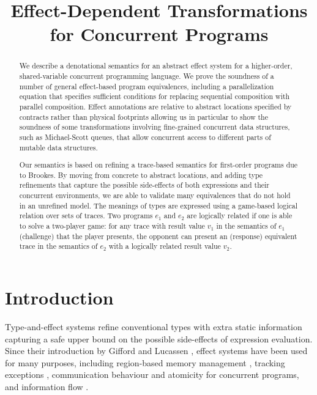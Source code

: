 \documentclass[nocopyrightspace,preprint]{sigplanconf}
\title{Effect-Dependent Transformations for Concurrent Programs}
\newcommand{\squelch}[1]{}
\begin{document}
\maketitle
\begin{abstract}  
We describe a denotational semantics for an abstract effect
system for a higher-order, shared-variable concurrent programming
language. We prove the soundness of a number of general effect-based
program equivalences, including a parallelization equation that
specifies sufficient conditions for replacing sequential composition
with parallel composition. Effect annotations are relative to abstract 
locations specified by contracts rather than physical footprints allowing us 
in particular to show the soundness of
some transformations involving fine-grained concurrent data structures, such as
Michael-Scott queues, that allow concurrent access to different parts
of mutable data structures.

Our semantics is based on refining a trace-based semantics for
first-order programs due to Brookes. By moving from concrete to
abstract locations, and adding type refinements that capture the
possible side-effects of both expressions and their concurrent
environments, we are able to validate many equivalences that do not
hold in an unrefined model.  The meanings of types are expressed using
a game-based logical relation over sets of traces. Two programs $e_1$
and $e_2$ are logically related if one is able to solve a two-player
game: for any trace with result value $v_1$ in the semantics of $e_1$
(challenge) that the player presents, the opponent can present an
(response) equivalent trace in the semantics of $e_2$ with a logically related result value $v_2$.

\end{abstract}
\squelch{
\category{F.3.2}{Logic and Meanings of Programs}{Semantics of Programming Languages -- Denotational semantics, Program analysis}
\category{F.3.2}{Logic and Meanings of Programs}{Studies of Program Constructs -- Type structure}
\terms
Languages, Theory
\keywords
Type and effect systems, region analysis, logical relations, parametricity, program transformation
}
\noindent
\section{Introduction}
\label{sec:intro}
Type-and-effect systems refine conventional types with extra
static information capturing a safe upper bound on the possible
side-effects of expression evaluation. Since their introduction by
Gifford and Lucassen \cite{DBLP:conf/lfp/GiffordL86},
effect systems have been used for many purposes, including
region-based memory management \cite{birkedaltoftevejlstrup}, tracking
exceptions \cite{pessauxleroy,bentonbuchlovsky}, communication
behaviour \cite{amtoftnielsons} and atomicity
\cite{flanaganqadeerpldi03} for concurrent programs, and information
flow \cite{brobergsands:flowlocks}. 
\end{document}

